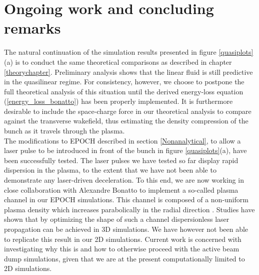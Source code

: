 \chapter{Ongoing work and concluding remarks}
The natural continuation of the simulation results presented in figure \ref{quasiplots}(a) is to conduct the same theoretical comparisons as described in chapter \ref{theorychapter}. Preliminary analysis shows that the linear fluid is still predictive in the quasilinear regime. For consistency, however, we choose to postpone the full theoretical analysis of this situation until the derived energy-loss equation (\ref{energy_loss_bonatto}) has been properly implemented. It is furthermore desirable to include the space-charge force in our theoretical analysis to compare against the transverse wakefield, thus estimating the density compression of the bunch as it travels through the plasma. \\
\indent The modifications to EPOCH described in section \ref{Nonanalytical}, to allow a laser pulse to be introduced in front of the bunch in figure \ref{quasiplots}(a), have been successfully tested. The laser pulses we have tested so far display rapid dispersion in the plasma, to the extent that we have not been able to demonstrate any laser-driven deceleration. To this end, we are now working in close collaboration with Alexandre Bonatto to implement a so-called plasma channel in our EPOCH simulations. This channel is composed of a non-uniform plasma density which increases parabolically in the radial direction . Studies have shown that by optimizing the shape of such a channel dispersionless laser propagation can be achieved in 3D simulations. We have however not been able to replicate this result in our 2D simulations. Current work is concerned with investigating why this is and how to otherwise proceed with the active beam dump simulations, given that we are at the present computationally limited to 2D simulations.

